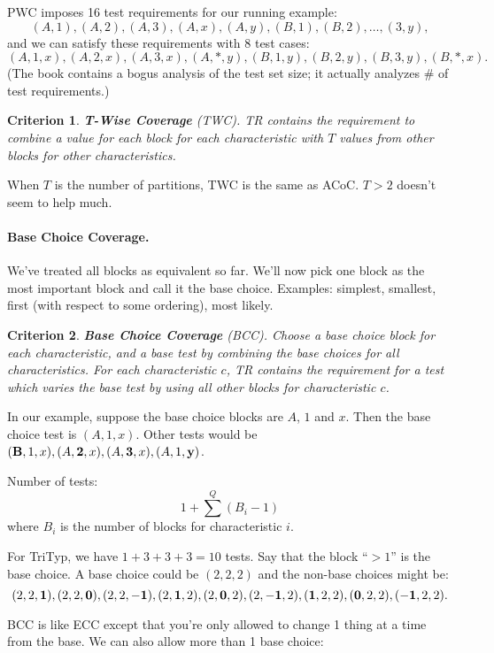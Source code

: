 \documentclass[11pt]{article}
\newtheorem{crit}{Criterion}
\begin{document}
PWC imposes 16 test requirements for our running example:
\[ (A, 1), (A, 2), (A, 3), (A, x), (A, y), (B, 1), (B, 2), \ldots, (3, y), \]
and we can satisfy these requirements with 8 test cases:
\[ (A, 1, x), (A, 2, x), (A, 3, x), (A, *, y), (B, 1, y), (B, 2, y),
(B, 3, y), (B, *, x). \]
(The book contains a bogus analysis of the test set size; it actually
analyzes \# of test requirements.)

\begin{crit}
{\bf T-Wise Coverage} (TWC). TR contains the requirement to combine
a value for each block for each characteristic with $T$ values from 
 other blocks for other characteristics.
\end{crit}
When $T$ is the number of partitions, TWC is the same as ACoC.
$T>2$ doesn't seem to help much.

\paragraph{Base Choice Coverage.} We've treated all blocks as 
equivalent so far. We'll now pick one block as the most important
block and call it the base choice. Examples: simplest, smallest,
first (with respect to some ordering), most likely.

\begin{crit}
{\bf Base Choice Coverage} (BCC). Choose a base choice block for each
characteristic, and a base test by combining the base choices for all
characteristics. For each characteristic $c$, TR contains the
requirement for a test which varies the base test by using all other
blocks for characteristic $c$.
\end{crit}

In our example, suppose the base choice blocks are $A$, $1$ and $x$. Then 
the base choice test is $(A, 1, x)$. Other tests would be $({\bf B}, 1, x), 
(A, {\bf 2}, x), (A, {\bf 3}, x), (A, 1, {\bf y})$.

Number of tests:
\[ 1 + \sum^Q (B_i - 1) \]
where $B_i$ is the number of blocks for characteristic $i$. 

For TriTyp,
we have $1 + 3 + 3 + 3 = 10$ tests. Say that the block ``$> 1$'' is the base
choice. A base choice could be $(2, 2, 2)$ and the non-base choices might be:
\[ (2, 2, {\bf 1}), (2, 2, {\bf 0}), (2, 2, {\bf -1}), (2, {\bf 1}, 2), 
(2, {\bf 0}, 2), (2, {\bf -1}, 2), ({\bf 1}, 2, 2), ({\bf 0}, 2, 2),
({\bf -1}, 2, 2).\]

BCC is like ECC except that you're only allowed to change 1 thing
at a time from the base. We can also allow more than 1 base choice:
\end{document}
